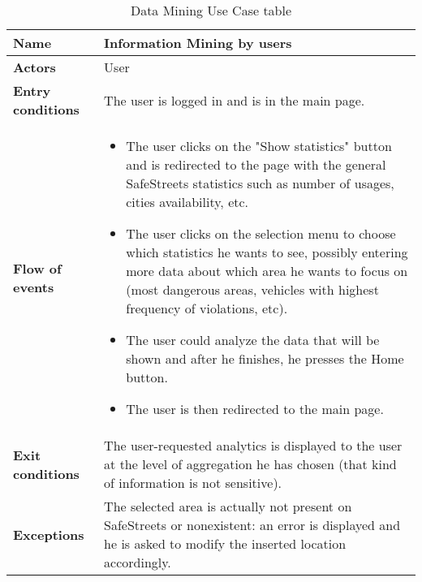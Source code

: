 \begin{table}[!htbp]
	\hypertarget{tab:dataminingtab}{}
	\centering
	\begin{tabular}{lp{9cm}}
\bf\large Name&\bf\large Information Mining by users\\
\hline
\hline
\bf Actors&User\\
\hline
\bf Entry conditions&The user is logged in and is in the main page.\\
\hline
\bf Flow of events&
\begin{itemize}

\item The user clicks on the "Show statistics" button and is redirected to the page with the general SafeStreets statistics such as number of usages, cities availability, etc.

\item The user clicks on the selection menu to choose which statistics he wants to see, possibly entering more data about which area he wants to focus on (most dangerous areas, vehicles with highest frequency of violations, etc).

\item The user could analyze the data that will be shown and after he finishes, he presses the Home button.

\item The user is then redirected to the main page.

\end{itemize}
\\
\hline
\bf Exit conditions&The user-requested analytics is displayed to the user at the level of aggregation he has chosen (that kind of information is not sensitive).\\
\hline
\bf Exceptions&The selected area is actually not present on SafeStreets or nonexistent: an error is displayed and he is asked to modify the inserted location accordingly.
\\
\hline

\end{tabular}
\caption{Data Mining Use Case table}
 \label{tab:dataminingtab}
\end{table}